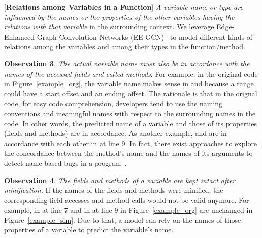 \vspace{2pt}
 [{\bf Relations among Variables in a
    Function}] {\em A variable name or type are influenced by the
  names or the properties of the other variables having the relations
  with that variable} in the surrounding context. We leverage
Edge-Enhanced Graph Convolution Networks (EE-GCN)~\cite{ee-gcn} to
model different kinds of relations among the variables and among their
types in the function/method.

\vspace{2pt} \textbf{Observation 3}. {\em The actual variable name
  must also be in accordance with the names of the accessed fields and
  called methods}. For example, in the original code in
Figure~\ref{example_org}, the variable name  makes sense
in  and  because a range
could have a start offset and an ending offset. The rationale is that
in the orignal code, for easy code comprehension, developers tend to
use the naming conventions and meaningful names with respect to the
surrounding names in the code. In other words, the predicted name of a
variable and those of its properties (fields and methods) are in
accordance. As another example,  and
 are in accordance with each other in
 at line 9. In fact, there exist
approaches to explore the concordance between the method's name and
the names of its arguments to detect name-based bugs in a
program~\cite{deepbugs-oopsla18}.

\vspace{2pt}
\textbf{Observation 4}. {\em The fields and methods of a variable are
  kept intact after minification.} If the names of the fields and
methods were minified, the corresponding field accesses and method
calls would not be valid anymore. For example,  in
 at line 7 and  in
 at line 9 in Figure~\ref{example_org} are
unchanged in Figure~\ref{example_sim}. Due to that, a model can rely
on the names of those properties of a variable to predict the
variable's name.

